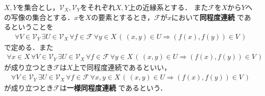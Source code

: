	\begin{screen}
		\begin{dfn}[同程度連続]
			$X,Y$を集合とし，$\mathscr{V}_X,\mathscr{V}_Y$をそれぞれ$X,Y$上の近縁系とする．
			また$\mathscr{F}$を$X$から$Y$への写像の集合とする．$x$を$X$の要素とするとき，$\mathscr{F}$が$x$において{\bf 同程度連続}
			であるということを
			\begin{align}
				\forall V \in \mathscr{V}_Y\, \exists U \in \mathscr{V}_X\, \forall f \in \mathscr{F}\,
				\forall y \in X\, \left(\, (x,y) \in U \Longrightarrow (f(x),f(y)) \in V\, \right)
			\end{align}
			で定める．また
			\begin{align}
				\forall x \in X\, \forall V \in \mathscr{V}_Y\, \exists U \in \mathscr{V}_X\, \forall f \in \mathscr{F}\,
				\forall y \in X\, \left(\, (x,y) \in U \Longrightarrow (f(x),f(y)) \in V\, \right)
			\end{align}
			が成り立つとき$\mathscr{F}$は$X$上で同程度連続であるといい，
			\begin{align}
				\forall V \in \mathscr{V}_Y\, \exists U \in \mathscr{V}_X\, \forall f \in \mathscr{F}\,
				\forall x,y \in X\, \left(\, (x,y) \in U \Longrightarrow (f(x),f(y)) \in V\, \right)
			\end{align}
			が成り立つとき$\mathscr{F}$は{\bf 一様同程度連続}
			であるという．
		\end{dfn}
	\end{screen}